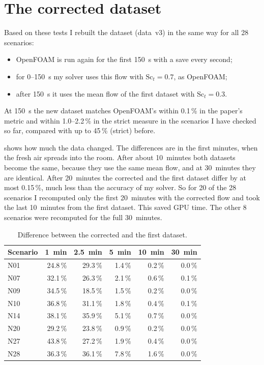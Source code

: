 \section{The corrected dataset}
Based on these tests I rebuilt the dataset (data~v3) in the same way for all 28 scenarios:
\begin{itemize}
  \item OpenFOAM is run again for the first 150~s with a save every second;
  \item for 0--150~s my solver uses this flow with $\mathrm{Sc}_t=0.7$, as OpenFOAM;
  \item after 150~s it uses the mean flow of the first dataset with $\mathrm{Sc}_t=0.3$.
\end{itemize}
At 150~s the new dataset matches OpenFOAM's \cotwo{} within 0.1\,\% in the paper's metric and within 1.0--2.2\,\%
in the strict measure in the scenarios I have checked so far, compared with up to 45\,\% (strict) before.

 shows how much the data changed. The differences are in the first minutes, when the fresh air
spreads into the room. After about 10~minutes both datasets become the same, because they use the same mean
flow, and at 30~minutes they are identical. After 20~minutes the corrected and the first dataset differ by at most 0.15\,\%, much less than the accuracy
of my solver. So for 20 of the 28 scenarios I recomputed only the first 20~minutes with the corrected flow and took
the last 10~minutes from the first dataset. This saved GPU time. The other 8 scenarios were recomputed for the full
30~minutes.

\begin{table}[h]
  \centering
  \caption{Difference between the corrected and the first dataset.}
  \label{tab:v3v2}
  \begin{tabular}{lrrrrr}
    \toprule
    Scenario & 1~min & 2.5~min & 5~min & 10~min & 30~min\\
    \midrule
    N01 & 24.8\,\% & 29.3\,\% & 1.4\,\% & 0.2\,\% & 0.0\,\%\\
    N07 & 32.1\,\% & 26.3\,\% & 2.1\,\% & 0.6\,\% & 0.1\,\%\\
    N09 & 34.5\,\% & 18.5\,\% & 1.5\,\% & 0.2\,\% & 0.0\,\%\\
    N10 & 36.8\,\% & 31.1\,\% & 1.8\,\% & 0.4\,\% & 0.1\,\%\\
    N14 & 38.1\,\% & 35.9\,\% & 5.1\,\% & 0.7\,\% & 0.0\,\%\\
    N20 & 29.2\,\% & 23.8\,\% & 0.9\,\% & 0.2\,\% & 0.0\,\%\\
    N27 & 43.8\,\% & 27.2\,\% & 1.9\,\% & 0.4\,\% & 0.0\,\%\\
    N28 & 36.3\,\% & 36.1\,\% & 7.8\,\% & 1.6\,\% & 0.0\,\%\\
    \bottomrule
  \end{tabular}
\end{table}

